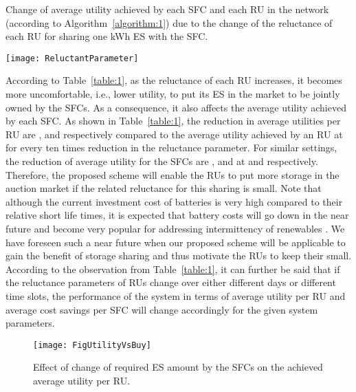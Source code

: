 \documentclass[journal,10pt]{IEEEtran}
\begin{document}
\begin{table}[t]
\centering
\caption{Change of average utility achieved by each SFC and each RU in the network (according to Algorithm~\ref{algorithm:1}) due to the change of the reluctance of each RU for sharing one kWh ES with the SFC.}
\texttt{[image: ReluctantParameter]}
\label{table:1}
\end{table}

According to Table~\ref{table:1}, as the reluctance of each RU increases, it becomes more uncomfortable, i.e., lower utility, to put its ES in the market to be jointly owned by the SFCs. As a consequence, it also affects the average utility achieved by each SFC. As shown in Table~\ref{table:1}, the reduction in average utilities per RU are ,  and  respectively compared to the average utility achieved by an RU at  for every ten times reduction in the reluctance parameter. For similar settings, the reduction of average utility for the SFCs are ,  and  at  and  respectively. Therefore, the proposed scheme will enable the RUs to put more storage in the auction  market if the related reluctance for this sharing is small. Note that although the current investment cost of batteries is very high compared to their relative short life times, it is expected that battery costs will go down in the near future \cite{Wang-JTSG:2013}  and become very popular for addressing intermittency of renewables \cite{Tesla:2015}. We have foreseen such a near future when our proposed scheme will be applicable to gain the benefit of storage sharing and thus motivate the RUs to keep their  small. According to the observation from Table~\ref{table:1}, it can further be said that if the reluctance parameters of RUs change over either different days or different time slots, the performance of the system in terms of average utility per RU and average cost savings per SFC will change accordingly for the given system parameters.
\begin{figure}[t]
\centering
\texttt{[image: FigUtilityVsBuy]}
\caption{Effect of change of required ES amount by the SFCs on the achieved average utility per RU.} \label{fig:UtilityVsBuyAmount}
\end{figure}
\end{document}
